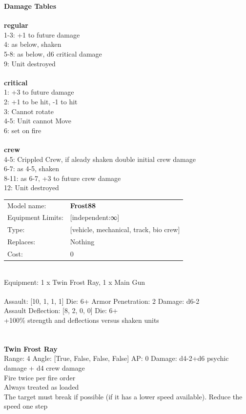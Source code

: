 {\bf Damage Tables} \\
\ \\ {\bf regular } \\
1-3: +1 to future damage \\
4: as below, shaken \\
5-8: as below, d6 critical damage \\
9: Unit destroyed \\
\ \\ {\bf critical } \\
1: +3 to future damage \\
2: +1 to be hit, -1 to hit \\
3: Cannot rotate \\
4-5: Unit cannot Move  \\
6: set on fire \\
\ \\ {\bf crew } \\
4-5: Crippled Crew, if aleady shaken double initial crew damage \\
6-7: as 4-5, shaken \\
8-11: as 6-7, +3 to future crew damage \\
12: Unit destroyed \\


\noindent
\begin{tabular}{ll}
Model name: &{\bf Frost88 } \\
Equipment Limits: &[independent:∞] \\
Type: &[vehicle, mechanical, track, bio crew] \\
Replaces: &Nothing \\
Cost: & 0\\
\end{tabular}
\ \\
Equipment: 1 x Twin Frost Ray, 1 x Main Gun \\
\ \\
Assault: [10, 1, 1, 1] Die: 6+ Armor Penetration: 2 Damage: d6-2 \\
Assault Deflection: [8, 2, 0, 0] Die: 6+\\
\indent +100\% strength and deflections versus shaken units\\ 
 
\ \\

\ \\
{\bf Twin Frost Ray } \\



Range: 4  Angle: [True, False, False, False] AP: 0 Damage: d4-2+d6 psychic damage + d4 crew damage \\
Fire twice per fire order\\ 
Always treated as loaded\\ 
The target must break if possible (if it has a lower speed available). Reduce the speed one step\\ 




